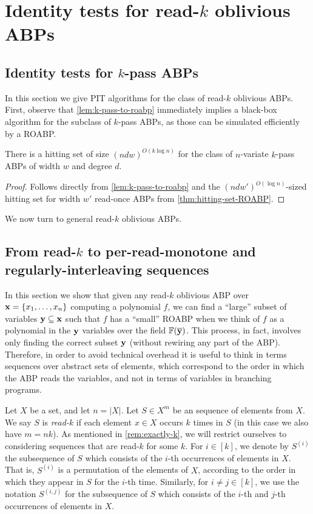 \documentclass[11pt]{article}
\begin{document}
\section{Identity tests for read-$k$ oblivious ABPs}
\label{sec:pit-read-k-abp}

\subsection{Identity tests for $k$-pass ABPs}\label{sec:pit-k-pass-abp}

In this section we give PIT algorithms for the class of read-$k$ oblivious ABPs. First, observe that  \autoref{lem:k-pass-to-roabp} immediately implies a black-box algorithm for the subclass of $k$-pass ABPs, as those can be simulated efficiently by a ROABP.

\begin{corollary}\label{cor:k-pass-hittingset}
There is a hitting set of size $(ndw)^{O(k \log n)}$ for the class of $n$-variate $k$-pass ABPs of width $w$ and degree $d$. 
\end{corollary}
\begin{proof}
Follows directly from \autoref{lem:k-pass-to-roabp} and the $(ndw')^{O(\log n)}$-sized hitting set for width $w'$ read-once ABPs from \autoref{thm:hitting-set-ROABP}.
\end{proof}

We now turn to general read-$k$ oblivious ABPs.

\subsection{From read-$k$ to per-read-monotone and regularly-interleaving sequences}

In this section we show that given any read-$k$ oblivious ABP over $\mathbf{x}=\{x_1, \ldots, x_n\}$ computing a polynomial $f$, we can find a ``large'' subset of variables $\mathbf{y} \subseteq \mathbf{x}$ such that $f$ has a ``small'' ROABP when we think of $f$ as a polynomial in the $\mathbf{y}$ variables over the field $\F(\overline{\vecy})$. This process, in fact, involves only finding the correct subset $\mathbf{y}$ (without rewiring any part of the ABP).  Therefore, in order to avoid technical overhead it is useful to think in terms sequences over abstract sets of elements, which correspond to the order in which the ABP reads the variables, and not in terms of variables in branching programs.

Let $X$ be a set, and let $n=|X|$.  Let $S \in X^{m}$ be an sequence of elements from $X$.  We say $S$ is \emph{read-$k$} if each element $x \in X$ occurs $k$ times in $S$ (in this case we also have $m=nk$). 
As mentioned in \autoref{rem:exactly-k}, we will restrict ourselves to considering sequences that are read-$k$ for some $k$.
For $i \in [k]$, we denote by $S^{(i)}$ the subsequence of $S$ which consists of the $i$-th occurrences of elements in $X$. That is, $S^{(i)}$ is a permutation of the elements of $X$, according to the order in which they appear in $S$ for the $i$-th time. Similarly, for $i\neq j \in [k]$, we use the notation $S^{(i,j)}$ for the subsequence of $S$ which consists of the $i$-th and $j$-th occurrences of elements in $X$.
\end{document}
